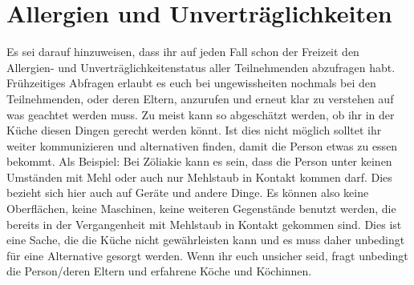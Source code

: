 \section{Allergien und Unverträglichkeiten}\label{sec:allergien-und-unvertraglichkeiten}
Es sei darauf hinzuweisen, dass ihr auf jeden Fall schon der Freizeit den Allergien- und Unverträglichkeitenstatus aller Teilnehmenden abzufragen habt.
Frühzeitiges Abfragen erlaubt es euch bei ungewissheiten nochmals bei den Teilnehmenden, oder deren Eltern, anzurufen und erneut klar zu verstehen auf was geachtet werden muss.
Zu meist kann so abgeschätzt werden, ob ihr in der Küche diesen Dingen gerecht werden könnt.
Ist dies nicht möglich solltet ihr weiter kommunizieren und alternativen finden, damit die Person etwas zu essen bekommt.
Als Beispiel: Bei Zöliakie kann es sein, dass die Person unter keinen Umständen mit Mehl oder auch nur Mehlstaub in Kontakt kommen darf.
Dies bezieht sich hier auch auf Geräte und andere Dinge.
Es können also keine Oberflächen, keine Maschinen, keine weiteren Gegenstände benutzt werden, die bereits in der Vergangenheit mit Mehlstaub in Kontakt gekommen sind.
Dies ist eine Sache, die die Küche nicht gewährleisten kann und es muss daher unbedingt für eine Alternative gesorgt werden.
Wenn ihr euch unsicher seid, fragt unbedingt die Person/deren Eltern und erfahrene Köche und Köchinnen.
